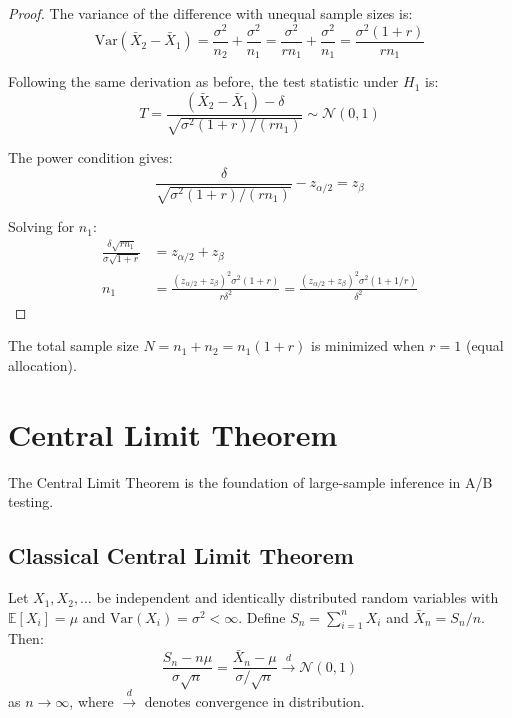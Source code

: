 \begin{proof}
The variance of the difference with unequal sample sizes is:
\begin{equation}
\text{Var}(\bar{X}_2 - \bar{X}_1) = \frac{\sigma^2}{n_2} + \frac{\sigma^2}{n_1} = \frac{\sigma^2}{rn_1} + \frac{\sigma^2}{n_1} = \frac{\sigma^2(1 + r)}{rn_1}
\end{equation}

Following the same derivation as before, the test statistic under $H_1$ is:
\begin{equation}
T = \frac{(\bar{X}_2 - \bar{X}_1) - \delta}{\sqrt{\sigma^2(1+r)/(rn_1)}} \sim \mathcal{N}(0,1)
\end{equation}

The power condition gives:
\begin{equation}
\frac{\delta}{\sqrt{\sigma^2(1+r)/(rn_1)}} - z_{\alpha/2} = z_\beta
\end{equation}

Solving for $n_1$:
\begin{align}
\frac{\delta\sqrt{rn_1}}{\sigma\sqrt{1+r}} &= z_{\alpha/2} + z_\beta \\
n_1 &= \frac{(z_{\alpha/2} + z_\beta)^2\sigma^2(1+r)}{r\delta^2} = \frac{(z_{\alpha/2} + z_\beta)^2\sigma^2(1 + 1/r)}{\delta^2}
\end{align}
\end{proof}

\begin{remark}
The total sample size $N = n_1 + n_2 = n_1(1+r)$ is minimized when $r = 1$ (equal allocation).
\end{remark}

\section{Central Limit Theorem}

The Central Limit Theorem is the foundation of large-sample inference in A/B testing.

\subsection{Classical Central Limit Theorem}

\begin{theorem}
Let $X_1, X_2, \ldots$ be independent and identically distributed random variables with $\mathbb{E}[X_i] = \mu$ and $\text{Var}(X_i) = \sigma^2 < \infty$. Define $S_n = \sum_{i=1}^n X_i$ and $\bar{X}_n = S_n/n$. Then:
\begin{equation}
\frac{S_n - n\mu}{\sigma\sqrt{n}} = \frac{\bar{X}_n - \mu}{\sigma/\sqrt{n}} \xrightarrow{d} \mathcal{N}(0, 1)
\end{equation}
as $n \to \infty$, where $\xrightarrow{d}$ denotes convergence in distribution.
\end{theorem}

